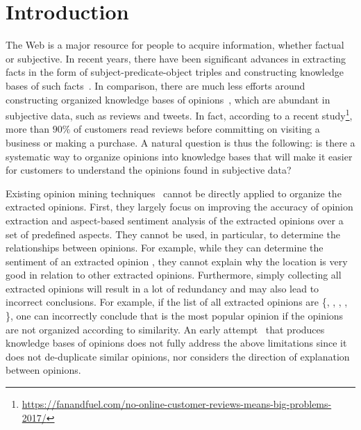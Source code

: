 \section{Introduction}\label{sec:intro}
The Web is a major resource for people to acquire information, whether factual or subjective. In recent years, there have been significant advances in extracting facts in the form of subject-predicate-object triples and constructing knowledge bases of such facts~\cite{weikum2010information, dong2014knowledge, nickel2015review, mitchell2018never}. In comparison, there are much less efforts around 
constructing organized knowledge bases of opinions~\cite{bhutanisampo}, which are abundant in subjective data, such as reviews and tweets. 
In fact, according to a recent study\footnote{\url{https://fanandfuel.com/no-online-customer-reviews-means-big-problems-2017/}}, more than $90\%$ of customers read reviews before committing on visiting a business or making a purchase. A natural question is thus the following: is there a systematic way to organize opinions into knowledge bases that will make it easier for customers to understand the opinions found in subjective data?


Existing opinion mining techniques~\cite{hu2004aaai, qiu2011coling, liu2012sentiment, pontiki2015semeval, pontiki2016semeval, xu2019bert} cannot be directly applied to organize
the extracted opinions. First, they largely focus on improving the 
accuracy of opinion extraction and aspect-based sentiment analysis of the extracted opinions over a set of predefined aspects. They cannot be used, in particular, to determine the relationships between opinions. For example, while they can determine the sentiment of an extracted opinion , they cannot explain why the location is very good in relation to other extracted opinions.
Furthermore, simply collecting all extracted opinions will result in a lot of redundancy and may also lead to incorrect conclusions. 
For example, if the list of all extracted opinions are \{, , , , \}, one can incorrectly conclude that  is the most popular opinion if the opinions are not organized according to similarity. 
An early attempt~\cite{bhutanisampo} that produces knowledge bases of opinions does not fully address the above limitations since it does not de-duplicate similar opinions, nor considers the direction of explanation between opinions. 

